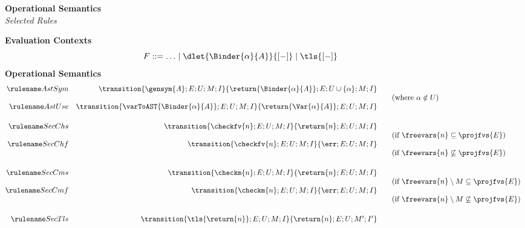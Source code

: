 \begin{figure}[t]
\begin{core-desc}
  \large{\textbf{Operational Semantics}}\\
  \normalsize{\textit{Selected Rules}}\\

  {
    \scriptsize

{\textbf{Evaluation Contexts}}\\
\[F ::= \ldots \mid \dlet{\Binder{\alpha}{A}}{[-]} \mid \tls{[-]} \] 
 {\textbf{Operational Semantics}}\\
\[
  \begin{array}{@{}rrcl}
  \astRule{Sym} & \transition{\coreConfiguration{\gensym{A}}{E}{U}{M}{I}}{\coreConfiguration{\return{\Binder{\alpha}{A}}}{E}{U\cup\{\alpha\}}{M}{I}}\\
  &&&\text{(where $\alpha \notin U$)}\\
  \astRule{Use} & \transition{\coreConfiguration{\varToAST{\Binder{\alpha}{A}}}{E}{U}{M}{I}}{\coreConfiguration{\return{\Var{\alpha}{A}}}{E}{U}{M}{I}}\\
  \vspace{1mm}
  \\ 
  \secRule{Chs} & \transition{\coreConfiguration{\checkfv{n}}{E}{U}{M}{I}}{\coreConfiguration{\return{n}}{E}{U}{M}{I}}\\
    &&&\text{(if $\freevars{n} \subseteq \projfvs{E}$)}\\
  \secRule{Chf} & \transition{\coreConfiguration{\checkfv{n}}{E}{U}{M}{I}}{\coreConfiguration{\err}{E}{U}{M}{I}}\\
  &&&\text{(if $\freevars{n} \not\subseteq \projfvs{E}$)}       \\\vspace{1mm}\\
  \secRule{Cms} & \transition{\coreConfiguration{\checkm{n}}{E}{U}{M}{I}}{\coreConfiguration{\return{n}}{E}{U}{M}{I}}\\
    &&&\text{(if $\freevars{n} \setminus M \subseteq \projfvs{E}$)}\\
  \secRule{Cmf} & \transition{\coreConfiguration{\checkm{n}}{E}{U}{M}{I}}{\coreConfiguration{\err}{E}{U}{M}{I}}\\
  &&&\text{(if $\freevars{n} \setminus M \not\subseteq \projfvs{E}$)}
\\ 
 \vspace{1mm}
\\
\secRule{Tls} & \transition{\coreConfiguration{\tls{\return{n}}}{E}{U}{M}{I}}{\coreConfiguration{\return{n}}{E}{U}{M'}{I'}}\\\vspace{1mm}

\end{array}\]}
\end{core-desc}
\end{figure}
